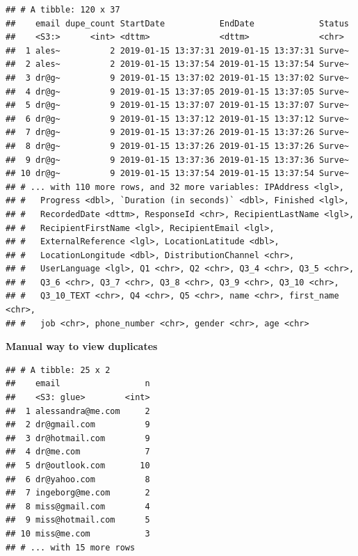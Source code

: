 \documentclass[]{book}
\newenvironment{Shaded}{\begin{snugshade}}{\end{snugshade}}
\newcommand{\CommentTok}[1]{\textcolor[rgb]{0.56,0.35,0.01}{\textit{#1}}}
\newcommand{\DecValTok}[1]{\textcolor[rgb]{0.00,0.00,0.81}{#1}}
\newcommand{\KeywordTok}[1]{\textcolor[rgb]{0.13,0.29,0.53}{\textbf{#1}}}
\newcommand{\NormalTok}[1]{#1}
\newcommand{\OperatorTok}[1]{\textcolor[rgb]{0.81,0.36,0.00}{\textbf{#1}}}
\newcommand{\StringTok}[1]{\textcolor[rgb]{0.31,0.60,0.02}{#1}}
\begin{document}
\begin{verbatim}
## # A tibble: 120 x 37
##    email dupe_count StartDate           EndDate             Status
##    <S3:>      <int> <dttm>              <dttm>              <chr> 
##  1 ales~          2 2019-01-15 13:37:31 2019-01-15 13:37:31 Surve~
##  2 ales~          2 2019-01-15 13:37:54 2019-01-15 13:37:54 Surve~
##  3 dr@g~          9 2019-01-15 13:37:02 2019-01-15 13:37:02 Surve~
##  4 dr@g~          9 2019-01-15 13:37:05 2019-01-15 13:37:05 Surve~
##  5 dr@g~          9 2019-01-15 13:37:07 2019-01-15 13:37:07 Surve~
##  6 dr@g~          9 2019-01-15 13:37:12 2019-01-15 13:37:12 Surve~
##  7 dr@g~          9 2019-01-15 13:37:26 2019-01-15 13:37:26 Surve~
##  8 dr@g~          9 2019-01-15 13:37:26 2019-01-15 13:37:26 Surve~
##  9 dr@g~          9 2019-01-15 13:37:36 2019-01-15 13:37:36 Surve~
## 10 dr@g~          9 2019-01-15 13:37:54 2019-01-15 13:37:54 Surve~
## # ... with 110 more rows, and 32 more variables: IPAddress <lgl>,
## #   Progress <dbl>, `Duration (in seconds)` <dbl>, Finished <lgl>,
## #   RecordedDate <dttm>, ResponseId <chr>, RecipientLastName <lgl>,
## #   RecipientFirstName <lgl>, RecipientEmail <lgl>,
## #   ExternalReference <lgl>, LocationLatitude <dbl>,
## #   LocationLongitude <dbl>, DistributionChannel <chr>,
## #   UserLanguage <lgl>, Q1 <chr>, Q2 <chr>, Q3_4 <chr>, Q3_5 <chr>,
## #   Q3_6 <chr>, Q3_7 <chr>, Q3_8 <chr>, Q3_9 <chr>, Q3_10 <chr>,
## #   Q3_10_TEXT <chr>, Q4 <chr>, Q5 <chr>, name <chr>, first_name <chr>,
## #   job <chr>, phone_number <chr>, gender <chr>, age <chr>
\end{verbatim}

\textbf{Manual way to view duplicates}

\begin{Shaded}
\end{Shaded}

\begin{verbatim}
## # A tibble: 25 x 2
##    email                 n
##    <S3: glue>        <int>
##  1 alessandra@me.com     2
##  2 dr@gmail.com          9
##  3 dr@hotmail.com        9
##  4 dr@me.com             7
##  5 dr@outlook.com       10
##  6 dr@yahoo.com          8
##  7 ingeborg@me.com       2
##  8 miss@gmail.com        4
##  9 miss@hotmail.com      5
## 10 miss@me.com           3
## # ... with 15 more rows
\end{verbatim}
\end{document}
